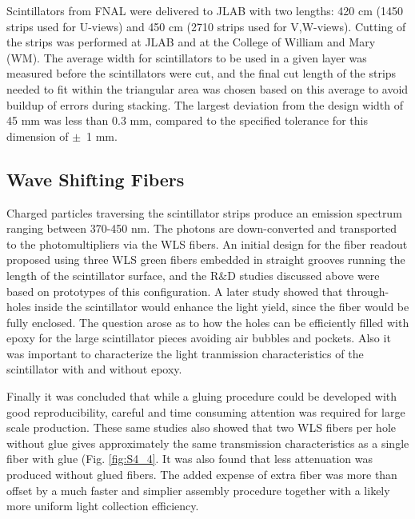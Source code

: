 Scintillators from FNAL were delivered to JLAB with two lengths: 420 cm (1450 strips used for U-views) and 450 cm (2710 strips used for V,W-views).   Cutting of the strips was performed at JLAB and at the College of William and Mary (WM). The average width for scintillators to be used in a given layer was measured before the scintillators were cut, and the final cut length of the strips needed to fit within the triangular area was chosen based on this average to avoid buildup of errors during stacking.  The largest deviation from the design width of 45 mm was less than 0.3 mm, compared to the specified  tolerance for this dimension of $\pm$~1 mm.

\subsection{Wave Shifting Fibers}
Charged particles traversing the scintillator strips produce an emission spectrum ranging between 370-450 nm. The photons are down-converted and transported to the photomultipliers via the WLS fibers. An initial design for the fiber readout proposed using three WLS green fibers embedded in straight grooves running the length of the scintillator surface, and the R$\&$D studies discussed above \cite{2007007} were based on prototypes of this configuration.  A later study \cite{2009018} showed that through-holes inside the scintillator would enhance the light yield, since the fiber would be fully enclosed. The question arose as to how the holes can be efficiently filled with epoxy for the large scintillator pieces avoiding air bubbles and pockets. Also it was important to characterize the light tranmission characteristics of the scintillator with and without epoxy.

Finally it was concluded \cite{2010012} that while a gluing procedure could be developed with good reproducibility, careful and time consuming attention was required for large scale production.  These same studies also showed that two WLS fibers per hole without glue gives approximately the same transmission characteristics as a single fiber with glue (Fig. \ref{fig:S4_4}.  It was also found that less attenuation was produced without glued fibers. The added expense of extra fiber was more than offset by a much faster and simplier assembly procedure together with a likely more uniform light collection efficiency. 

